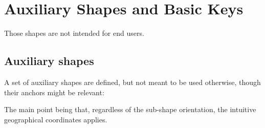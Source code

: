 \documentclass[a4paper, titlepage]{article}
\begin{document}
\section{Auxiliary Shapes and Basic Keys}
Those shapes are not intended for end users.

\subsection{Auxiliary shapes}\label{auxiliarynodes}
A set of auxiliary shapes are defined, but not meant to be used otherwise, though their anchors might be relevant:



\begin{tsremark}
The main point being that, regardless of the sub-shape orientation, the intuitive geographical coordinates applies.
\end{tsremark}


        
\end{document}

